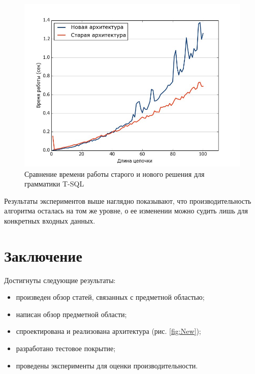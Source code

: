 \documentclass[14pt]{matmex-diploma}
\begin{document}
\begin{figure}[H]
 \includegraphics[width=\textwidth]{images/MsSql.jpg}
 \caption{Сравнение времени работы старого и нового решения для грамматики T-SQL}
 \label{exp2}
\end{figure}
Результаты экспериментов выше наглядно показывают, что производительность алгоритма осталась на том же уровне, о ее изменении можно судить лишь для конкретных входных данных.

\newpage
\section{Заключение}
Достигнуты следующие результаты:
\begin{itemize}
    \item произведен обзор статей, связанных с предметной областью;
    \item написан обзор предметной области;
    \item спроектирована и реализована архитектура (рис. \ref{fig:New});
    \item разработано тестовое покрытие;
    \item проведены эксперименты для оценки производительности.
\end{itemize}

\setmonofont[Mapping=tex-text]{CMU Typewriter Text}


\end{document}
